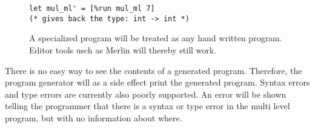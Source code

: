 \begin{figure}[H]
  \centering
\begin{verbatim}
let mul_ml' = [%run mul_ml 7]
(* gives back the type: int -> int *)
\end{verbatim}  
  \caption{A specialized program will be treated as any hand written program. Editor tools usch as Merlin will thereby still work.}
\end{figure}

There is no easy way to see the contents of a generated program. Therefore, the program generator will as a side effect print the generated program. Syntax errors and type errors are currently also poorly supported. An error will be shown telling the programmer that there is a syntax or type error in the multi level program, but with no information about where.

